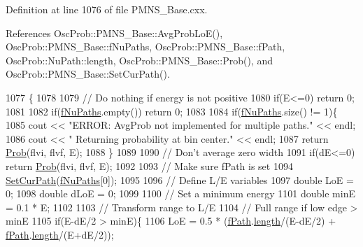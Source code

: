 Definition at line 1076 of file P\+M\+N\+S\+\_\+\+Base.\+cxx.



References Osc\+Prob\+::\+P\+M\+N\+S\+\_\+\+Base\+::\+Avg\+Prob\+Lo\+E(), Osc\+Prob\+::\+P\+M\+N\+S\+\_\+\+Base\+::f\+Nu\+Paths, Osc\+Prob\+::\+P\+M\+N\+S\+\_\+\+Base\+::f\+Path, Osc\+Prob\+::\+Nu\+Path\+::length, Osc\+Prob\+::\+P\+M\+N\+S\+\_\+\+Base\+::\+Prob(), and Osc\+Prob\+::\+P\+M\+N\+S\+\_\+\+Base\+::\+Set\+Cur\+Path().


\begin{DoxyCode}
1077 \{
1078 
1079   \textcolor{comment}{// Do nothing if energy is not positive}
1080   \textcolor{keywordflow}{if}(E<=0) \textcolor{keywordflow}{return} 0;
1081 
1082   \textcolor{keywordflow}{if}(\hyperlink{classOscProb_1_1PMNS__Base_a69db9d57e12fc7cbe0431bc6c18fac93}{fNuPaths}.empty()) \textcolor{keywordflow}{return} 0;
1083 
1084   \textcolor{keywordflow}{if}(\hyperlink{classOscProb_1_1PMNS__Base_a69db9d57e12fc7cbe0431bc6c18fac93}{fNuPaths}.size() != 1)\{
1085     cout << \textcolor{stringliteral}{"ERROR: AvgProb not implemented for multiple paths."} << endl;
1086     cout << \textcolor{stringliteral}{"       Returning probability at bin center."} << endl;
1087     \textcolor{keywordflow}{return} \hyperlink{classOscProb_1_1PMNS__Base_aec5c399b93261f1962a4b7dbbb44b973}{Prob}(flvi, flvf, E);
1088   \}
1089 
1090   \textcolor{comment}{// Don't average zero width}
1091   \textcolor{keywordflow}{if}(dE<=0) \textcolor{keywordflow}{return} \hyperlink{classOscProb_1_1PMNS__Base_aec5c399b93261f1962a4b7dbbb44b973}{Prob}(flvi, flvf, E);
1092 
1093   \textcolor{comment}{// Make sure fPath is set}
1094   \hyperlink{classOscProb_1_1PMNS__Base_a986e6ebef09a7e2eb7fee16a4c2c834d}{SetCurPath}(\hyperlink{classOscProb_1_1PMNS__Base_a69db9d57e12fc7cbe0431bc6c18fac93}{fNuPaths}[0]);
1095 
1096   \textcolor{comment}{// Define L/E variables}
1097   \textcolor{keywordtype}{double} LoE = 0;
1098   \textcolor{keywordtype}{double} dLoE = 0;
1099 
1100   \textcolor{comment}{// Set a minimum energy}
1101   \textcolor{keywordtype}{double} minE = 0.1 * E;
1102 
1103   \textcolor{comment}{// Transform range to L/E}
1104   \textcolor{comment}{// Full range if low edge > minE}
1105   \textcolor{keywordflow}{if}(E-dE/2 > minE)\{
1106     LoE = 0.5 * (\hyperlink{classOscProb_1_1PMNS__Base_a849437aa8891fe042e86886ce8f81c6e}{fPath}.\hyperlink{structOscProb_1_1NuPath_af22660894b6e25cf835500381b155557}{length}/(E-dE/2) + \hyperlink{classOscProb_1_1PMNS__Base_a849437aa8891fe042e86886ce8f81c6e}{fPath}.\hyperlink{structOscProb_1_1NuPath_af22660894b6e25cf835500381b155557}{length}/(E+dE/2));

\end{DoxyCode}
